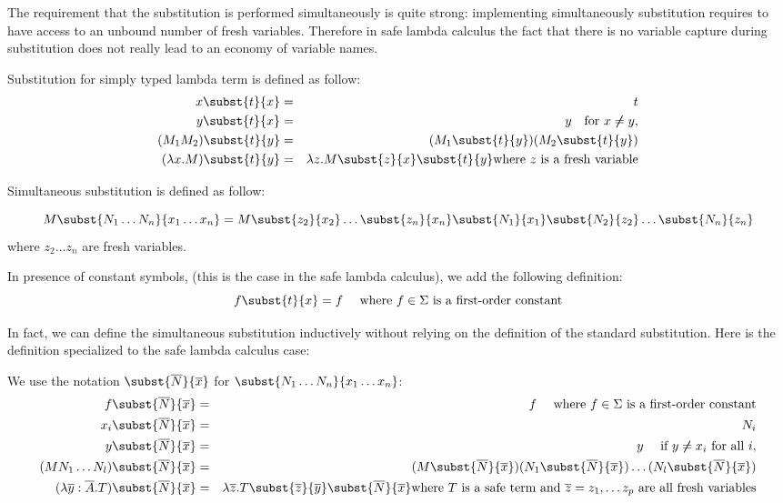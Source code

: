 \documentclass{article}
\begin{document}
The requirement that the substitution is performed simultaneously is
quite strong: implementing simultaneously substitution requires to
have access to an unbound number of fresh variables. Therefore in
safe lambda calculus the fact that there is no variable capture
during substitution does not really lead to an economy of variable
names.


\begin{dfn}
Substitution for simply typed lambda term is defined as follow:
\begin{eqnarray*}
x \subst{t}{x} &=& t\\
 y\subst{t}{x} &=& y \quad \mbox{for } x \not \neq y,\\
(M_1 M_2) \subst{t}{y} &=& (M_1 \subst{t}{y}) (M_2 \subst{t}{y})\\
(\lambda x . M) \subst{t}{y} &=& \lambda z . M \subst{z}{x} \subst{t}{y} \mbox{where $z$ is a fresh variable}
\end{eqnarray*}

Simultaneous substitution is defined as follow:

$$M\subst{N_1 \ldots N_n}{x_1 \ldots x_n} = M \subst{z_2}{x_2} \ldots \subst{z_n}{x_n} \subst{N_1}{x_1} \subst{N_2}{z_2} \ldots \subst{N_n}{z_n} $$
where $z_2 \ldots z_n$ are fresh variables.


In presence of constant symbols, (this is the case in the safe
lambda calculus), we add the following definition:
$$f \subst{t}{x} = f \quad \mbox{ where $f \in \Sigma$ is a first-order constant}$$

\end{dfn}

In fact, we can define the simultaneous substitution inductively
without relying on the definition of the standard substitution. Here
is the definition specialized to the safe lambda calculus case:

\begin{dfn}
\label{dnf:safe_simsubst}
 We use the notation
$\subst{\overline{N}}{\overline{x}}$ for $\subst{N_1 \ldots N_n}{x_1
\ldots x_n}$:
\begin{eqnarray*}
f \subst{\overline{N}}{\overline{x}} &=& f \quad \mbox{ where $f\in\Sigma$ is a first-order constant} \\
x_i \subst{\overline{N}}{\overline{x}} &=& N_i\\
 y \subst{\overline{N}}{\overline{x}} &=& y \quad \mbox{ if } y \not \neq x_i \mbox{ for all } i,\\
(M N_1 \ldots N_l) \subst{\overline{N}}{\overline{x}} &=& (M \subst{\overline{N}}{\overline{x}}) (N_1 \subst{\overline{N}}{\overline{x}}) \ldots  (N_l \subst{\overline{N}}{\overline{x}})\\
(\lambda \overline{y} : \overline{A}. T)
\subst{\overline{N}}{\overline{x}} &=& \lambda \overline{z} . T
\subst{\overline{z}}{\overline{y}}
\subst{\overline{N}}{\overline{x}} \mbox{where $T$ is a safe term
and $\overline{z} = z_1, \ldots z_p$ are all fresh variables}
\end{eqnarray*}
\end{dfn}
\end{document}
